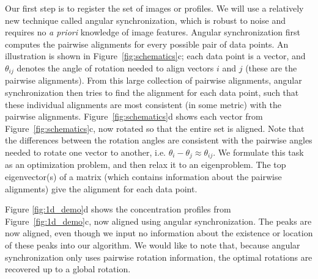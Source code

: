 \documentclass{pnastwo}
\begin{document}
\begin{article}
Our first step is to register the set of images or profiles.
%
%
%
We will use a relatively new technique called angular synchronization\cite{singer2011angular}, which is robust to noise and requires no {\em a priori} knowledge of image features.
%
Angular synchronization first computes the pairwise alignments %
for every possible pair of data points.%
%
An illustration is shown in Figure~\ref{fig:schematics}c;
each data point is a vector, and $\theta_{ij}$ denotes the angle of rotation needed to align vectors $i$ and $j$ (these are the pairwise alignments).
%
From this large collection of pairwise alignments, angular synchronization then tries to find the alignment for each data point, such that these individual alignments are most consistent (in some metric) with the pairwise alignments.
%
Figure~\ref{fig:schematics}d shows each vector from Figure~\ref{fig:schematics}c, now rotated so that the entire set is aligned.
%
Note that the differences between the rotation angles are consistent with the pairwise angles needed to rotate one vector to another, i.e. $\theta_i - \theta_j \approx \theta_{ij}$.
%
We formulate this task as an optimization problem, and then relax it to an eigenproblem.
%
The top eigenvector(s) of a matrix (which contains information about the pairwise alignments) give the alignment for each data point.
%

Figure \ref{fig:1d_demo}d shows the concentration profiles from Figure~\ref{fig:1d_demo}c, now aligned using angular synchronization.
%
The peaks are now aligned, even though we input no information about the existence or location of these peaks into our algorithm.
%
We would like to note that, because angular synchronization only uses pairwise rotation information, the optimal rotations are recovered up to a global rotation.


\end{article}
\end{document}
